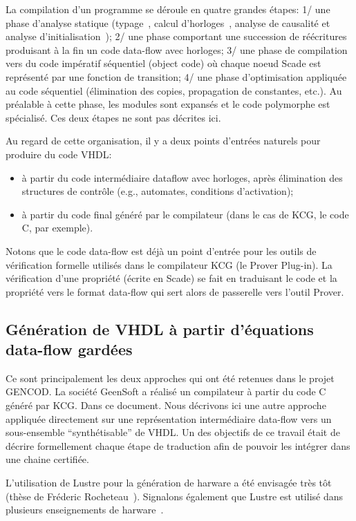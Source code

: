\documentclass[a4paper]{article}
\newcommand{\lustre}{{\sc Lustre}}
\begin{document}
La compilation d'un programme se d\'eroule en quatre grandes \'etapes: 1/
une phase d'analyse statique (typage~\cite{lucy:emsoft03}, calcul
d'horloges~\cite{lucy:emsoft04}, analyse de causalit\'e et analyse
d'initialisation~\cite{lucy:sttt04}); 2/ une phase comportant une
succession de r\'e\'ecritures produisant \`a la fin un code data-flow avec
horloges; 3/ une phase de compilation vers du code imp\'eratif
s\'equentiel (object code) o\`u chaque noeud Scade est repr\'esent\'e
par une fonction de transition; 4/ une phase
d'optimisation appliqu\'ee au code s\'equentiel (\'elimination des copies,
propagation de constantes, etc.). Au pr\'ealable \`a cette phase, les modules
sont expans\'es et le code polymorphe est sp\'ecialis\'e. Ces deux \'etapes ne sont pas
d\'ecrites ici.

Au regard de cette organisation, il y a deux points d'entr\'ees naturels
pour produire du code VHDL:
\begin{itemize}
\item \`a partir du code interm\'ediaire dataflow avec horloges, apr\`es
  \'elimination des structures de contr\^ole (e.g., automates, conditions
  d'activation);
\item
\`a partir du code final g\'en\'er\'e par le compilateur (dans le cas de KCG, le
code C, par exemple).
\end{itemize}
Notons que le code data-flow est d\'ej\`a un point d'entr\'ee pour les
outils de v\'erification formelle utilis\'es dans le compilateur KCG (le
Prover Plug-in). La v\'erification d'une propri\'et\'e (\'ecrite en Scade) se
fait en traduisant le code et la propri\'et\'e vers le format data-flow
qui sert alors de passerelle vers l'outil Prover.

\subsection{G\'en\'eration de VHDL \`a partir d'\'equations data-flow gard\'ees}
Ce sont principalement les deux approches qui ont \'et\'e retenues dans le
projet GENCOD. La soci\'et\'e GeenSoft a r\'ealis\'e un compilateur \`a partir
du code C g\'en\'er\'e par KCG. Dans ce document. Nous d\'ecrivons ici une autre
approche appliqu\'ee directement sur une repr\'esentation interm\'ediaire data-flow
vers un sous-ensemble ``synth\'etisable'' de VHDL. Un des objectifs
de ce travail \'etait de d\'ecrire formellement chaque \'etape de traduction
afin de pouvoir les int\'egrer dans une chaine certifi\'ee.

L'utilisation de Lustre pour la g\'en\'eration de harware a \'et\'e envisag\'ee
tr\`es t\^ot (th\`ese de Fr\'ederic Rocheteau~\cite{lustre:rocheteau91}). Signalons
\'egalement que \lustre{} est utilis\'e dans plusieurs enseignements de
harware~\cite{lustre:amblard05}.
\end{document}

